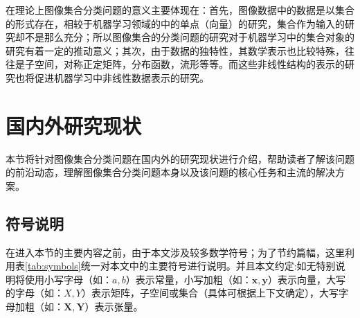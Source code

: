 在理论上图像集合分类问题的意义主要体现在：首先，图像数据中的数据是以集合的形式存在，相较于机器学习领域的中的单点（向量）的研究，集合作为输入的研究却不是那么充分；所以图像集合的分类问题的研究对于机器学习中的集合对象的研究有着一定的推动意义；其次，由于数据的独特性，其数学表示也比较特殊，往往是子空间，对称正定矩阵，分布函数，流形等等。而这些非线性结构的表示的研究也将促进机器学习中非线性数据表示的研究。
\section{国内外研究现状}
\label{sec:current}
本节将针对图像集合分类问题在国内外的研究现状进行介绍，帮助读者了解该问题的前沿动态，理解图像集合分类问题本身以及该问题的核心任务和主流的解决方案。
\subsection{符号说明}
\label{sec:symbols}
在进入本节的主要内容之前，由于本文涉及较多数学符号；为了节约篇幅，这里利用表\ref{tab:symbols}统一对本文中的主要符号进行说明。并且本文约定:如无特别说明将使用小写字母（如：$a,b$）表示常量，小写加粗（如：$\bm{x},\bm{y}$）表示向量，大写的字母（如：$X,Y$）表示矩阵，子空间或集合（具体可根据上下文确定），大写字母加粗（如：$\bm{X},\bm{Y}$）表示张量。
